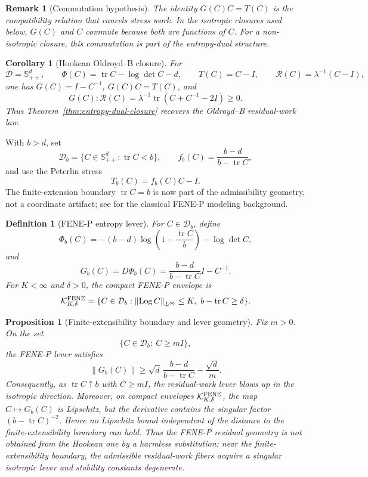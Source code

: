 \documentclass[11pt]{article}
\numberwithin{equation}{section}
\newtheorem{proposition}[theorem]{Proposition}
\newtheorem{corollary}[theorem]{Corollary}
\newtheorem{definition}[theorem]{Definition}
\newtheorem{remark}[theorem]{Remark}
\newcommand{\Id}{I}
\newcommand{\Spp}{\mathbb S_{++}}
\newcommand{\tr}{\operatorname{tr}}
\newcommand{\Log}{\operatorname{Log}}
\newcommand{\calD}{\mathcal D}
\newcommand{\calK}{\mathcal K}
\newcommand{\norm}[1]{\left\lVert #1\right\rVert}
\begin{document}
\begin{remark}[Commutation hypothesis]
\label{rem:commutation-hypothesis}
The identity \(G(C)C=T(C)\) is the compatibility relation that cancels stress
work.  In the isotropic closures used below, \(G(C)\) and \(C\) commute because
both are functions of \(C\).  For a non-isotropic closure, this commutation is
part of the entropy-dual structure.
\end{remark}

\begin{corollary}[Hookean Oldroyd--B closure]
\label{cor:hookean-closure}
For
\[
  \calD=\Spp^d,\qquad
  \Phi(C)=\tr C-\log\det C-d,\qquad
  T(C)=C-\Id,\qquad
  \mathcal R(C)=\lambda^{-1}(C-\Id),
\]
one has \(G(C)=\Id-C^{-1}\), \(G(C)C=T(C)\), and
\[
  G(C):\mathcal R(C)
  =
  \lambda^{-1}\tr(C+C^{-1}-2\Id)\ge0.
\]
Thus Theorem~\ref{thm:entropy-dual-closure} recovers the Oldroyd--B
residual-work law.
\end{corollary}

With \(b>d\), set
\[
  \calD_b=\{C\in\Spp^d:\tr C<b\},\qquad
  f_b(C)=\frac{b-d}{b-\tr C},
\]
and use the Peterlin stress
\[
  T_b(C)=f_b(C)C-\Id .
\]
The finite-extension boundary \(\tr C=b\) is now part of the admissibility
geometry, not a coordinate artifact; see \cite{Bird,ChilcottRallison1988} for
the classical FENE-P modeling background.

\begin{definition}[FENE-P entropy lever]
\label{def:fenep-lever}
For \(C\in\calD_b\), define
\[
  \Phi_b(C)
  =
  - (b-d)\log\!\left(1-\frac{\tr C}{b}\right)-\log\det C,
\]
and
\[
  G_b(C)=D\Phi_b(C)
  =
  \frac{b-d}{b-\tr C}\Id-C^{-1}.
\]
For \(K<\infty\) and \(\delta>0\), the compact FENE-P envelope is
\[
  \calK_{K,\delta}^{\rm FENE}
  =
  \{C\in\calD_b:\norm{\Log C}_{L^\infty}\le K,\ b-\tr C\ge\delta\}.
\]
\end{definition}

\begin{proposition}[Finite-extensibility boundary and lever geometry]
\label{prop:fenep-boundary-geometry}
Fix \(m>0\).  On the set
\[
  \{C\in\calD_b:\ C\ge mI\},
\]
the FENE-P lever satisfies
\[
  \norm{G_b(C)}
  \ge
  \sqrt d\,\frac{b-d}{b-\tr C}-\frac{\sqrt d}{m}.
  \label{eq:fenep-lever-blowup}
\]
Consequently, as \(\tr C\uparrow b\) with \(C\ge mI\), the residual-work lever
blows up in the isotropic direction.  Moreover, on compact envelopes
\(\calK_{K,\delta}^{\rm FENE}\), the map \(C\mapsto G_b(C)\) is Lipschitz, but
the derivative contains the singular factor \((b-\tr C)^{-2}\).  Hence no
Lipschitz bound independent of the distance to the finite-extensibility
boundary can hold.  Thus the FENE-P residual geometry is not obtained from the
Hookean one by a harmless substitution: near the finite-extensibility boundary,
the admissible residual-work fibers acquire a singular isotropic lever and
stability constants degenerate.
\end{proposition}
\end{document}
